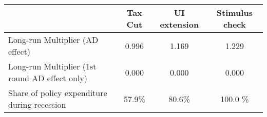 \begin{tabular}{@{}lccc@{}} 
\toprule 
& Tax Cut    & UI extension    & Stimulus check    \\  \midrule 
Long-run Multiplier (AD effect) &0.996  & 1.169  & 1.229     \\ 
Long-run Multiplier (1st round AD effect only) &0.000  & 0.000  & 0.000     \\ 
Share of policy expenditure during recession &57.9\%  & 80.6\%  & 100.0 \%    \\ 
\end{tabular}  

